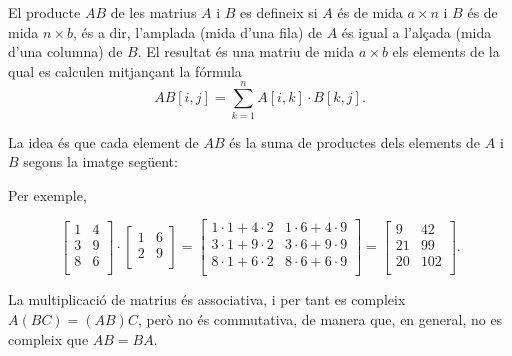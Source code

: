 El producte $AB$ de les matrius $A$ i $B$ es defineix si $A$ és de
mida $a \times n$ i $B$ és de mida $n \times b$, és a dir, l'amplada
(mida d'una fila) de $A$ és igual a l'alçada (mida d'una columna) de
$B$. El resultat és una matriu de mida $a \times b$ els elements de la
qual es calculen mitjançant la fórmula
\[
AB[i,j] = \sum_{k=1}^n A[i,k] \cdot B[k,j].
\]


La idea és que cada element de $AB$ és la suma de productes dels
elements de $A$ i $B$ segons la imatge següent:


\begin{center}
\end{center}


Per exemple,


\[
 \begin{bmatrix}
  1 & 4 \\
  3 & 9 \\
  8 & 6 \\
 \end{bmatrix}
\cdot
 \begin{bmatrix}
  1 & 6 \\
  2 & 9 \\
 \end{bmatrix}
=
 \begin{bmatrix}
  1 \cdot 1 + 4 \cdot 2 & 1 \cdot 6 + 4 \cdot 9 \\
  3 \cdot 1 + 9 \cdot 2 & 3 \cdot 6 + 9 \cdot 9 \\
  8 \cdot 1 + 6 \cdot 2 & 8 \cdot 6 + 6 \cdot 9 \\
 \end{bmatrix}
=
 \begin{bmatrix}
  9 & 42 \\
  21 & 99 \\
  20 & 102 \\
 \end{bmatrix}.
\]


La multiplicació de matrius és associativa, i per tant es compleix $A(BC)=(AB)C$,
però no és commutativa, de manera que, en general, no es compleix que $AB = BA$.

